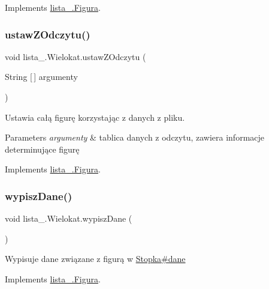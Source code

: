 Implements \mbox{\hyperlink{interfacelista__5_1_1_figura_a3cc13bf7229b288d743be7903b3b61a4}{lista\+\_.\+Figura}}.

\mbox{\label{classlista__5_1_1_wielokat_a8427c86e5be650cbece5464eee1ac053}} 
\subsubsection{\texorpdfstring{ustaw\+Z\+Odczytu()}{ustawZOdczytu()}}
{\footnotesize\ttfamily void lista\+\_.\+Wielokat.\+ustaw\+Z\+Odczytu (\begin{DoxyParamCaption}\item[{String \mbox{[}$\,$\mbox{]}}]{argumenty }\end{DoxyParamCaption})}

Ustawia całą figurę korzystając z danych z pliku. 
\begin{DoxyParams}{Parameters}
{\em argumenty} & tablica danych z odczytu, zawiera informacje determinujące figurę\\
\hline
\end{DoxyParams}
 

Implements \mbox{\hyperlink{interfacelista__5_1_1_figura_a75b72b51014348d839e1f2b81525f264}{lista\+\_.\+Figura}}.

\mbox{\label{classlista__5_1_1_wielokat_ad1df79cd3736bb0fcf3ba2252409f3f8}} 
\subsubsection{\texorpdfstring{wypisz\+Dane()}{wypiszDane()}}
{\footnotesize\ttfamily void lista\+\_.\+Wielokat.\+wypisz\+Dane (\begin{DoxyParamCaption}{ }\end{DoxyParamCaption})}

Wypisuje dane związane z figurą w \mbox{\hyperlink{classlista__5_1_1_stopka_a8e8ef21758defd5b137e609b00d2f59e}{Stopka\#dane}} 

Implements \mbox{\hyperlink{interfacelista__5_1_1_figura_aaddd90c61fd1632655cb031efafe1a7d}{lista\+\_.\+Figura}}.

